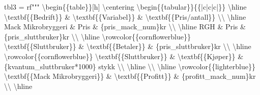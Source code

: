 \documentclass[
  12pt,
  a4paper,
  DIV=11,
  numbers=noendperiod]{scrartcl}
\newenvironment{Shaded}{\begin{snugshade}}{\end{snugshade}}
\newcommand{\CharTok}[1]{\textcolor[rgb]{0.13,0.47,0.30}{#1}}
\newcommand{\DecValTok}[1]{\textcolor[rgb]{0.68,0.00,0.00}{#1}}
\newcommand{\NormalTok}[1]{\textcolor[rgb]{0.00,0.23,0.31}{#1}}
\newcommand{\OperatorTok}[1]{\textcolor[rgb]{0.37,0.37,0.37}{#1}}
\newcommand{\SpecialCharTok}[1]{\textcolor[rgb]{0.37,0.37,0.37}{#1}}
\newcommand{\VerbatimStringTok}[1]{\textcolor[rgb]{0.13,0.47,0.30}{#1}}
\begin{document}
\begin{Shaded}
\begin{Highlighting}[]
\NormalTok{tbl3 }\OperatorTok{=} \VerbatimStringTok{rf"""}
\VerbatimStringTok{\textbackslash{}begin}\CharTok{\{\{}\VerbatimStringTok{table}\CharTok{\}\}}\VerbatimStringTok{[h]}
\VerbatimStringTok{\textbackslash{}centering}
\VerbatimStringTok{\textbackslash{}begin}\CharTok{\{\{}\VerbatimStringTok{tabular}\CharTok{\}\}\{\{}\VerbatimStringTok{|c|c|c|}\CharTok{\}\}}
\VerbatimStringTok{\textbackslash{}hline}
\VerbatimStringTok{\textbackslash{}textbf}\CharTok{\{\{}\VerbatimStringTok{Bedrift}\CharTok{\}\}}\VerbatimStringTok{ \& \textbackslash{}textbf}\CharTok{\{\{}\VerbatimStringTok{Variabel}\CharTok{\}\}}\VerbatimStringTok{ \& \textbackslash{}textbf}\CharTok{\{\{}\VerbatimStringTok{Pris/antall}\CharTok{\}\}}\VerbatimStringTok{ \textbackslash{}\textbackslash{} \textbackslash{}hline}
\VerbatimStringTok{Mack Mikrobryggeri \& Pris \& }\SpecialCharTok{\{}\NormalTok{pris\_mack\_num}\SpecialCharTok{\}}\VerbatimStringTok{kr \textbackslash{}\textbackslash{} \textbackslash{}hline}
\VerbatimStringTok{RGH \& Pris \& }\SpecialCharTok{\{}\NormalTok{pris\_sluttbruker}\SpecialCharTok{\}}\VerbatimStringTok{kr \textbackslash{}\textbackslash{} \textbackslash{}hline}
\VerbatimStringTok{\textbackslash{}rowcolor}\CharTok{\{\{}\VerbatimStringTok{cornflowerblue}\CharTok{\}\}}\VerbatimStringTok{ \textbackslash{}textbf}\CharTok{\{\{}\VerbatimStringTok{Sluttbruker}\CharTok{\}\}}\VerbatimStringTok{ \& \textbackslash{}textbf}\CharTok{\{\{}\VerbatimStringTok{Betaler}\CharTok{\}\}}\VerbatimStringTok{ \& }\SpecialCharTok{\{}\NormalTok{pris\_sluttbruker}\SpecialCharTok{\}}\VerbatimStringTok{kr \textbackslash{}\textbackslash{} \textbackslash{}hline}
\VerbatimStringTok{\textbackslash{}rowcolor}\CharTok{\{\{}\VerbatimStringTok{cornflowerblue}\CharTok{\}\}}\VerbatimStringTok{ \textbackslash{}textbf}\CharTok{\{\{}\VerbatimStringTok{Sluttbruker}\CharTok{\}\}}\VerbatimStringTok{ \& \textbackslash{}textbf}\CharTok{\{\{}\VerbatimStringTok{Kjøper}\CharTok{\}\}}\VerbatimStringTok{ \& }\SpecialCharTok{\{}\NormalTok{kvantum\_sluttbruker}\OperatorTok{*}\DecValTok{1000}\SpecialCharTok{\}}\VerbatimStringTok{ stykk \textbackslash{}\textbackslash{} \textbackslash{}hline \textbackslash{}\textbackslash{} \textbackslash{}hline}
\VerbatimStringTok{\textbackslash{}rowcolor}\CharTok{\{\{}\VerbatimStringTok{lighterblue}\CharTok{\}\}}\VerbatimStringTok{ \textbackslash{}textbf}\CharTok{\{\{}\VerbatimStringTok{Mack Mikrobryggeri}\CharTok{\}\}}\VerbatimStringTok{ \& \textbackslash{}textbf}\CharTok{\{\{}\VerbatimStringTok{Profitt}\CharTok{\}\}}\VerbatimStringTok{ \& }\SpecialCharTok{\{}\NormalTok{profitt\_mack\_num}\SpecialCharTok{\}}\VerbatimStringTok{kr \textbackslash{}\textbackslash{} \textbackslash{}hline}

\end{Highlighting}
\end{Shaded}
\end{document}
